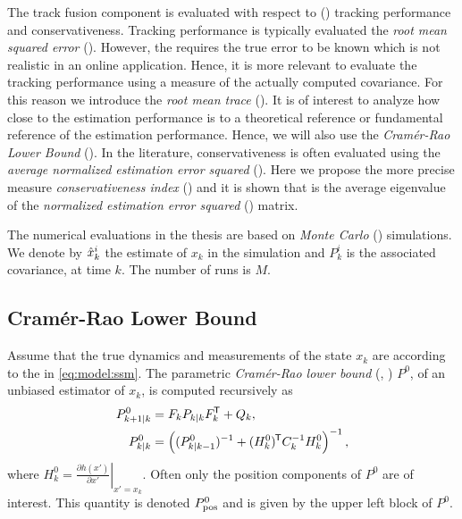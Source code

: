 The track fusion component is evaluated with respect to (\wrt) tracking performance and conservativeness. Tracking performance is typically evaluated \wrt the \emph{root mean squared error} (\abbrRMSE). However, the \abbrRMSE requires the true error to be known which is not realistic in an online application. Hence, it is more relevant to evaluate the tracking performance using a measure of the actually computed covariance. For this reason we introduce the \emph{root mean trace} (\abbrRMT). It is of interest to analyze how close to the estimation performance is to a theoretical reference or fundamental reference of the estimation performance. Hence, we will also use the \emph{Cram\'{e}r-Rao Lower Bound} (\abbrCRLB). In the literature, conservativeness is often evaluated using the \emph{average normalized estimation error squared} (\abbrANEES). Here we propose the more precise measure \emph{conservativeness index} (\abbrCOIN) and it is shown that \abbrANEES is the average eigenvalue of the \emph{normalized estimation error squared} (\abbrNEES) matrix.

The numerical evaluations in the thesis are based on \emph{Monte Carlo} (\abbrMC) simulations. We denote by $\hat{x}_k^i$ the estimate of $x_k$ in the \ith \abbrMC simulation and $P_k^i$ is the associated covariance, at time $k$. The number of \abbrMC runs is $M$.



\subsection{Cram\'{e}r-Rao Lower Bound} \label{sec:clrb}

Assume that the true dynamics and measurements of the state $x_k$ are according to the \abbrSSM in \eqref{eq:model:ssm}. The parametric \emph{Cram\'{e}r-Rao lower bound} (\abbrCRLB, \cite{Taylor1979TAC}) $P^0$, of an unbiased estimator of $x_k$, is computed recursively as \cite{Fritsche2016ICASSP}
\begin{subequations} \label{eq:def:crlb}
\begin{align}
	P_{k+1|k}^0 &= F_kP_{k|k} F_k^{\mkern-1.5mu\mathsf{T}} + Q_k, \\
	P_{k|k}^0 &= \left( (P_{k|k-1}^0)^{-1} + (H_k^0)^{\mkern-1.5mu\mathsf{T}} C_k^{-1} H_k^0 \right)^{-1},	
\end{align}	
\end{subequations}
where $H_k^0=\left.\frac{\partial h(x')}{\partial x'}\right\vert_{x'=x_k}$. Often only the position components of $P^0$ are of interest. This quantity is denoted $P_\text{pos}^0$ and is given by the upper left block of $P^0$.


